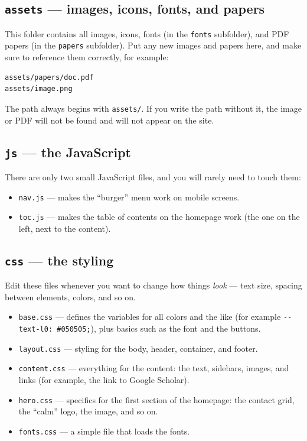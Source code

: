 \documentclass[11pt,a4paper]{article}
\newcommand{\file}[1]{\texttt{#1}}
\begin{document}
\subsection{\file{assets} — images, icons, fonts, and papers}

This folder contains all images, icons, fonts (in the \file{fonts}
subfolder), and PDF papers (in the \file{papers} subfolder). Put any new
images and papers here, and make sure to reference them correctly, for
example:

\begin{lstlisting}[style=shell]
assets/papers/doc.pdf
assets/image.png
\end{lstlisting}

\begin{importantbox}
The path always begins with \file{assets/}. If you write the path
without it, the image or PDF will not be found and will not appear on the
site.
\end{importantbox}

\subsection{\file{js} — the JavaScript}

There are only two small JavaScript files, and you will rarely need to
touch them:

\begin{itemize}[leftmargin=1.4em]
  \item \file{nav.js} — makes the ``burger'' menu work on mobile screens.
  \item \file{toc.js} — makes the table of contents on the homepage work
        (the one on the left, next to the content).
\end{itemize}

\subsection{\file{css} — the styling}

Edit these files whenever you want to change how things \emph{look} — text
size, spacing between elements, colors, and so on.

\begin{itemize}[leftmargin=1.4em]
  \item \file{base.css} — defines the variables for all colors and the
        like (for example \texttt{-{}-text-l0: \#050505;}), plus basics
        such as the font and the buttons.
  \item \file{layout.css} — styling for the body, header, container, and
        footer.
  \item \file{content.css} — everything for the content: the text,
        sidebars, images, and links (for example, the link to Google
        Scholar).
  \item \file{hero.css} — specifics for the first section of the homepage:
        the contact grid, the ``calm'' logo, the image, and so on.
  \item \file{fonts.css} — a simple file that loads the fonts.
\end{itemize}
\end{document}
